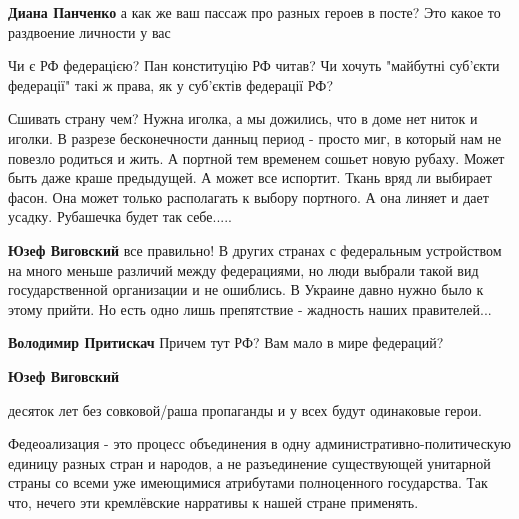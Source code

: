 \begin{itemize}
\textbf{Диана Панченко} а как же ваш пассаж про разных героев в посте? Это какое то раздвоение личности у вас


Чи є РФ федерацією? Пан конституцію РФ читав? Чи хочуть "майбутні суб'єкти
федерації" такі ж права, як у суб'єктів федерації РФ?


Сшивать страну чем? Нужна иголка, а мы дожились, что в доме нет ниток и иголки.
В разрезе бесконечности данныц период - просто миг, в который нам не повезло
родиться и жить. А портной тем временем сошьет новую рубаху. Может быть даже
краше предыдущей. А может все испортит. Ткань вряд ли выбирает фасон. Она может
только располагать к выбору портного. А она линяет и дает усадку. Рубашечка
будет так себе.....

 
\textbf{Юзеф Виговский} все правильно! В других странах с федеральным
устройством на много меньше различий между федерациями, но люди выбрали такой
вид государственной организации и не ошиблись. В Украине давно нужно было к
этому прийти. Но есть одно лишь препятствие - жадность наших правителей...

 
\textbf{Володимир Притискач} Причем тут РФ? Вам мало в мире федераций?

 
\textbf{Юзеф Виговский} 

десяток лет без совковой/раша пропаганды и у всех будут одинаковые герои.

Федеоализация - это процесс объединения в одну административно-политическую
единицу разных стран и народов, а не разъединение существующей унитарной страны
со всеми уже имеющимися атрибутами полноценного государства. Так что, нечего
эти кремлёвские нарративы к нашей стране применять.

 

\end{itemize}
